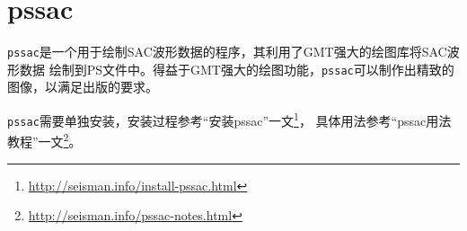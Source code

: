 \section{pssac}
\label{sec:pssac}

\verb+pssac+是一个用于绘制SAC波形数据的程序，其利用了GMT强大的绘图库将SAC波形数据
绘制到PS文件中。得益于GMT强大的绘图功能，\verb+pssac+可以制作出精致的图像，以满足出版的要求。

\verb+pssac+需要单独安装，安装过程参考``安装pssac''一文\footnote{\url{http://seisman.info/install-pssac.html}}，
具体用法参考``pssac用法教程''一文\footnote{\url{http://seisman.info/pssac-notes.html}}。

